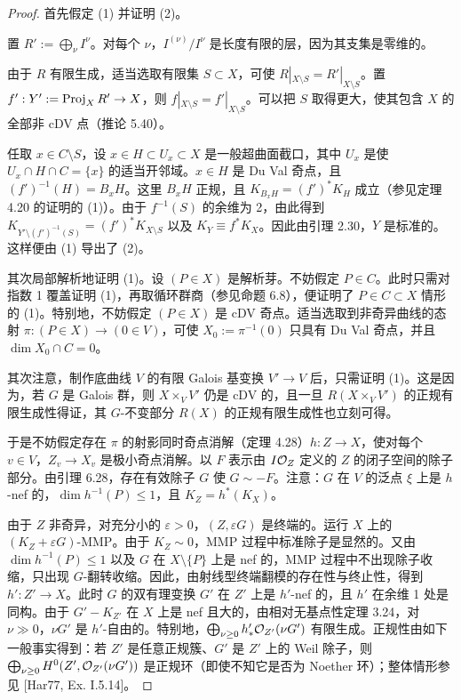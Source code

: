 \begin{proof}
首先假定 (1) 并证明 (2)。

置 $R':=\bigoplus_{\nu}I^{\nu}$。对每个 $\nu$，$I^{(\nu)}/I^{\nu}$ 是长度有限的层，因为其支集是零维的。

由于 $R$ 有限生成，适当选取有限集 $S\subset X$，可使 $R|_{X\setminus S}=R'|_{X\setminus S}$。置 $f':Y':=\operatorname{Proj}_X R'\to X$，则 $f|_{X\setminus S}=f'|_{X\setminus S}$。可以把 $S$ 取得更大，使其包含 $X$ 的全部非 cDV 点（推论 5.40）。

任取 $x\in C\setminus S$，设 $x\in H\subset U_x\subset X$ 是一般超曲面截口，其中 $U_x$ 是使 $U_x\cap H\cap C=\{x\}$ 的适当开邻域。$x\in H$ 是 Du Val 奇点，且 $(f')^{-1}(H)=B_xH$。这里 $B_xH$ 正规，且 $K_{B_xH}=(f')^*K_H$ 成立（参见定理 4.20 的证明的 (1)）。由于 $f^{-1}(S)$ 的余维为 2，由此得到 $K_{Y'\setminus(f')^{-1}(S)}=(f')^*K_{X\setminus S}$ 以及 $K_Y\equiv f^*K_X$。因此由引理 2.30，$Y$ 是标准的。这样便由 (1) 导出了 (2)。

其次局部解析地证明 (1)。设 $(P\in X)$ 是解析芽。不妨假定 $P\in C$。此时只需对指数 1 覆盖证明 (1)，再取循环群商（参见命题 6.8），便证明了 $P\in C\subset X$ 情形的 (1)。特别地，不妨假定 $(P\in X)$ 是 cDV 奇点。适当选取到非奇异曲线的态射 $\pi:(P\in X)\to(0\in V)$，可使 $X_0:=\pi^{-1}(0)$ 只具有 Du Val 奇点，并且 $\dim X_0\cap C=0$。

其次注意，制作底曲线 $V$ 的有限 Galois 基变换 $V'\to V$ 后，只需证明 (1)。这是因为，若 $G$ 是 Galois 群，则 $X\times_V V'$ 仍是 cDV 的，且一旦 $R(X\times_V V')$ 的正规有限生成性得证，其 $G$-不变部分 $R(X)$ 的正规有限生成性也立刻可得。

于是不妨假定存在 $\pi$ 的射影同时奇点消解（定理 4.28）$h:Z\to X$，使对每个 $v\in V$，$Z_v\to X_v$ 是极小奇点消解。以 $F$ 表示由 $I\mathcal{O}_Z$ 定义的 $Z$ 的闭子空间的除子部分。由引理 6.28，存在有效除子 $G$ 使 $G\sim-F$。注意：$G$ 在 $V$ 的泛点 $\xi$ 上是 $h$-nef 的，$\dim h^{-1}(P)\le1$，且 $K_Z=h^*(K_X)$。

由于 $Z$ 非奇异，对充分小的 $\varepsilon>0$，$(Z,\varepsilon G)$ 是终端的。运行 $X$ 上的 $(K_Z+\varepsilon G)$-MMP。由于 $K_Z\sim0$，MMP 过程中标准除子是显然的。又由 $\dim h^{-1}(P)\le1$ 以及 $G$ 在 $X\setminus\{P\}$ 上是 nef 的，MMP 过程中不出现除子收缩，只出现 $G$-翻转收缩。因此，由射线型终端翻模的存在性与终止性，得到 $h':Z'\to X$。此时 $G$ 的双有理变换 $G'$ 在 $Z'$ 上是 $h'$-nef 的，且 $h'$ 在余维 1 处是同构。由于 $G'-K_{Z'}$ 在 $X$ 上是 nef 且大的，由相对无基点性定理 3.24，对 $\nu\gg0$，$\nu G'$ 是 $h'$-自由的。特别地，$\bigoplus_{\nu\ge0}h'_*\mathcal{O}_{Z'}(\nu G')$ 有限生成。正规性由如下一般事实得到：若 $Z'$ 是任意正规簇、$G'$ 是 $Z'$ 上的 Weil 除子，则 $\bigoplus_{\nu\ge0}H^0(Z',\mathcal{O}_{Z'}(\nu G'))$ 是正规环（即使不知它是否为 Noether 环）；整体情形参见 [Har77, Ex. I.5.14]。


\end{proof}
